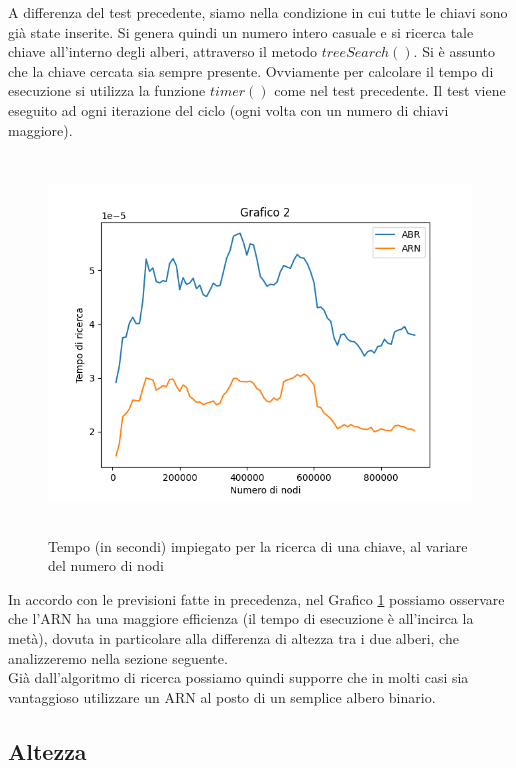 \documentclass{article}
\begin{document}
A differenza del test precedente, siamo nella condizione in cui tutte le chiavi sono già state inserite. Si genera quindi un numero intero casuale e si ricerca tale chiave all'interno degli alberi, attraverso il metodo $treeSearch()$. Si è assunto che la chiave cercata sia sempre presente. Ovviamente per calcolare il tempo di esecuzione si utilizza la funzione $timer()$ come nel test precedente. Il test viene eseguito ad ogni iterazione del ciclo (ogni volta con un numero di chiavi maggiore).

\begin{figure}[h]
\includegraphics[height=10cm]{Figure_2.png}
\centering
\caption{Tempo (in secondi) impiegato per la ricerca di una chiave, al variare del numero di nodi}
\label{fig:mesh2}
\end{figure}

In accordo con le previsioni fatte in precedenza, nel Grafico \ref{fig:mesh2} possiamo osservare che l'ARN ha una maggiore efficienza (il tempo di esecuzione è all'incirca la metà), dovuta in particolare alla differenza di altezza tra i due alberi, che analizzeremo nella sezione seguente.\\
Già dall'algoritmo di ricerca possiamo quindi supporre che in molti casi sia vantaggioso utilizzare un ARN al posto di un semplice albero binario.

\subsection{Altezza}
\end{document}
